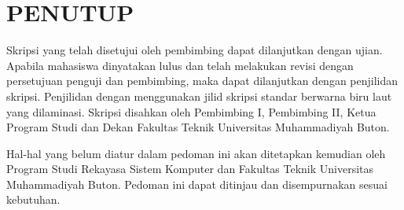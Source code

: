 \chapter{PENUTUP}

Skripsi yang telah disetujui oleh pembimbing dapat dilanjutkan dengan ujian. Apabila mahasiswa dinyatakan lulus dan telah melakukan revisi dengan persetujuan penguji dan pembimbing, maka dapat dilanjutkan dengan penjilidan skripsi. Penjilidan dengan menggunakan jilid skripsi standar berwarna biru laut yang dilaminasi. Skripsi disahkan oleh Pembimbing I, Pembimbing II, Ketua Program Studi dan Dekan Fakultas Teknik Universitas Muhammadiyah Buton.

Hal-hal yang belum diatur dalam pedoman ini akan ditetapkan kemudian oleh Program Studi Rekayasa Sistem Komputer dan Fakultas Teknik Universitas Muhammadiyah Buton. Pedoman ini dapat ditinjau dan disempurnakan sesuai kebutuhan.
